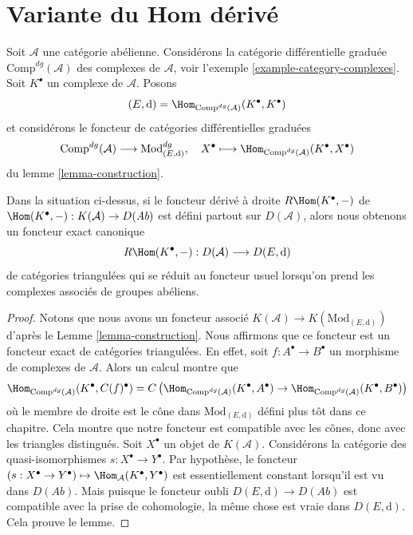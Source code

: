 \section{Variante du Hom dérivé}
\label{section-variant}

\noindent
Soit $\mathcal{A}$ une catégorie abélienne. Considérons la catégorie
différentielle graduée $\text{Comp}^{dg}(\mathcal{A})$ des complexes de
$\mathcal{A}$, voir l'exemple \ref{example-category-complexes}. Soit $K^\bullet$
un complexe de $\mathcal{A}$. Posons
$$
(E, \text{d}) = \Hom_{\text{Comp}^{dg}(\mathcal{A})}(K^\bullet, K^\bullet)
$$
et considérons le foncteur de catégories différentielles graduées
$$
\text{Comp}^{dg}(\mathcal{A}) \longrightarrow \text{Mod}^{dg}_{(E, \text{d})},
\quad
X^\bullet
\longmapsto
\Hom_{\text{Comp}^{dg}(\mathcal{A})}(K^\bullet, X^\bullet)
$$
du lemme \ref{lemma-construction}.

\begin{lemma}
\label{lemma-existence-of-derived}
Dans la situation ci-dessus, si le foncteur dérivé à droite $R\Hom(K^\bullet, -)$
de $\Hom(K^\bullet, -) : K(\mathcal{A}) \to D(\textit{Ab})$ est défini partout sur
$D(\mathcal{A})$, alors nous obtenons un foncteur exact canonique
$$
R\Hom(K^\bullet, -) : D(\mathcal{A}) \longrightarrow D(E, \text{d})
$$
de catégories triangulées qui se réduit au foncteur usuel lorsqu'on prend
les complexes associés de groupes abéliens.
\end{lemma}

\begin{proof}
Notons que nous avons un foncteur associé $K(\mathcal{A}) \to K(\text{Mod}_{(E,
\text{d})})$ d'après le Lemme \ref{lemma-construction}. Nous affirmons que ce
foncteur est un foncteur exact de catégories triangulées. En effet, soit $f :
A^\bullet \to B^\bullet$ un morphisme de complexes de $\mathcal{A}$. Alors un
calcul montre que
$$
\Hom_{\text{Comp}^{dg}(\mathcal{A})}(K^\bullet, C(f)^\bullet)
=
C\left(
\Hom_{\text{Comp}^{dg}(\mathcal{A})}(K^\bullet, A^\bullet) \to
\Hom_{\text{Comp}^{dg}(\mathcal{A})}(K^\bullet, B^\bullet)
\right)
$$
où le membre de droite est le cône dans $\text{Mod}_{(E, \text{d})}$ défini plus tôt
dans ce chapitre. Cela montre que notre foncteur est compatible avec les cônes,
donc avec les triangles distingués. Soit $X^\bullet$ un objet de $K(\mathcal{A})$.
Considérons la catégorie des quasi-isomorphismes $s : X^\bullet \to Y^\bullet$. Par hypothèse, le foncteur $(s : X^\bullet \to Y^\bullet) \mapsto
\Hom_\mathcal{A}(K^\bullet, Y^\bullet)$ est essentiellement constant lorsqu'il est
vu dans $D(\textit{Ab})$. Mais puisque le foncteur oubli $D(E, \text{d}) \to
D(\textit{Ab})$ est compatible avec la prise de cohomologie, la même chose est
vraie dans $D(E, \text{d})$. Cela prouve le lemme.
\end{proof}

